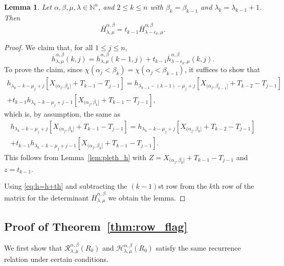 \documentclass[12pt]{amsart}
\numberwithin{equation}{section}
\newtheorem{lem}[thm]{Lemma}
\theoremstyle{definition}
\newcommand\ovh{\overline{h}}
\newcommand\ovH{\overline{H}}
\newcommand\NN{\mathbb{N}}
\newcommand\R{\mathcal{R}}
\newcommand\HH{\mathcal{H}}
\begin{document}
\begin{lem}\label{lem:H=H+tH}
  Let $\alpha,\beta,\mu,\lambda\in\NN^n$, and $2\le k\le n$
  with $\beta_k=\beta_{k-1}$ and $\lambda_k=\lambda_{k-1}+1$. Then
\[
  \ovH_{\lambda,\mu}^{\alpha,\beta} = t_{k-1}
  \ovH_{\lambda-\epsilon_k,\mu}^{\alpha,\beta}.
\]
\end{lem}
\begin{proof}
  We claim that, for all $1\le j\le n$,
  \begin{equation}\label{eq:h=h+th}
  \ovh_{\lambda,\mu}^{\alpha,\beta}(k,j)
  =\ovh_{\lambda,\mu}^{\alpha,\beta}(k-1,j)
  +t_{k-1} \ovh_{\lambda-\epsilon_k,\mu}^{\alpha,\beta}(k,j).
\end{equation}
To prove the claim, since $\chi(\alpha_j<\beta_k)=\chi(\alpha_j<\beta_{k-1})$,
it suffices to show that
  \begin{multline*}
    h_{\lambda_k-k-\mu_j+j}[X_{(\alpha_j,\beta_k]}+T_{k-1}-T_{j-1}]
    =h_{\lambda_{k-1}-(k-1)-\mu_j+j}[X_{(\alpha_j,\beta_{k-1}]}+T_{k-2}-T_{j-1}]\\
    +t_{k-1} h_{\lambda_k-k-\mu_j+j-1}[X_{(\alpha_j,\beta_k]}+T_{k-1}-T_{j-1}],
  \end{multline*}
  which is, by assumption, the same as
  \begin{multline*}
    h_{\lambda_k-k-\mu_j+j}[X_{(\alpha_j,\beta_k]}+T_{k-1}-T_{j-1}]
    =h_{\lambda_{k}-k-\mu_j+j}[X_{(\alpha_j,\beta_{k}]}+T_{k-2}-T_{j-1}]\\
    +t_{k-1} h_{\lambda_k-k-\mu_j+j-1}[X_{(\alpha_j,\beta_k]}+T_{k-1}-T_{j-1}].
  \end{multline*}
  This follows from Lemma~\ref{lem:pleth_h} with
  $Z=X_{(\alpha_j,\beta_k]}+T_{k-1}-T_{j-1}$ and $z=t_{k-1}$.

  Using \eqref{eq:h=h+th} and subtracting the $(k-1)$st row from the $k$th row
  of the matrix for the determinant $\ovH_{\lambda,\mu}^{\alpha,\beta}$ we
  obtain the lemma.
\end{proof}

\subsection{Proof of Theorem~\ref{thm:row_flag}}

We first show that $\R^{\alpha,\beta}_{\lambda,\mu}(R_0)$ and
$\HH^{\alpha,\beta}_{\lambda,\mu}(R_0)$ satisfy the same recurrence relation
under certain conditions.
\end{document}

